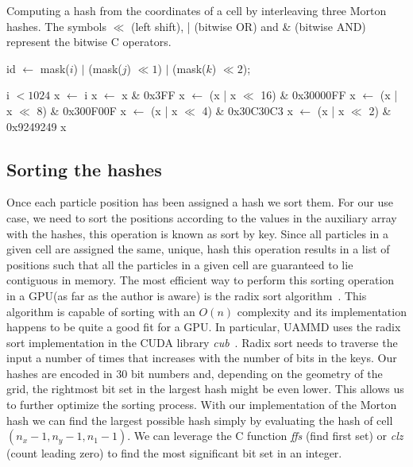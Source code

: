 \documentclass[ twoside,openright,titlepage,numbers=noenddot,%
headinclude,footinclude,cleardoublepage=empty,abstract=on,
BCOR=5mm,paper=b5,fontsize=11pt, dvipsnames
]{scrreprt}
\newcommand{\uammd}{\gls{UAMMD}\xspace}
\newcommand{\gpu}{\gls{GPU}\xspace}
\begin{document}
\begin{algorithm}
  \caption{Computing a hash from the coordinates of a cell by interleaving three Morton hashes. The symbols $\ll$ (left shift), | (bitwise OR) and \& (bitwise AND) represent the bitwise C operators. } \label{alg:mortonhash}
  \begin{algorithmic}[1]
    
    \State \Return id $\gets$ mask($i$) $|$ (mask($j$)  $\ll 1$) $|$ (mask($k$) $\ll 2$);
    \EndFunction

    \Ensure i $< 1024$
    \State x $\gets$ i     
    \State x $\gets$ x \& 0x3FF
    \State x $\gets$ (x | x $\ll$  16) \& 0x30000FF
    \State x $\gets$ (x | x $\ll$  8)  \& 0x300F00F
    \State x $\gets$ (x | x $\ll$  4)  \& 0x30C30C3
    \State x $\gets$ (x | x $\ll$  2)  \& 0x9249249
    \State \Return x
    \EndFunction

  \end{algorithmic}
\end{algorithm}



\subsection*{Sorting the hashes}
Once each particle position has been assigned a hash we sort them. For our use case, we need to sort the positions according to the values in the auxiliary array with the hashes, this operation is known as sort by key. Since all particles in a given cell are assigned the same, unique, hash this operation results in a list of positions such that all the particles in a given cell are guaranteed to lie contiguous in memory.
The most efficient way to perform this sorting operation in a \gpu (as far as the author is aware) is the radix sort algorithm~\cite{Ha2009,Singh2018,Merrill2011}. This algorithm is capable of sorting with an $O(n)$ complexity and its implementation happens to be quite a good fit for a \gpu. In particular, \uammd uses the radix sort implementation in the CUDA library \emph{cub}~\cite{cub}. Radix sort needs to traverse the input a number of times that increases with the number of bits in the keys. Our hashes are encoded in $30$ bit numbers and, depending on the geometry of the grid, the rightmost bit set in the largest hash might be even lower. This allows us to further optimize the sorting process. With our implementation of the Morton hash we can find the largest possible hash simply by evaluating the hash of cell $(n_x-1, n_y-1, n_1-1)$. We can leverage the C function \emph{ffs} (find first set) or \emph{clz} (count leading zero) to find the most significant bit set in an integer.
\end{document}
